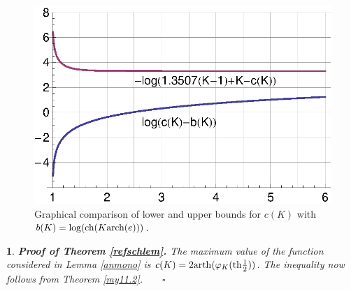 \documentclass[12pt,a4paper,leqno]{amsart}
\theoremstyle{plain}
\newtheorem{subsec}[equation]{}
\numberwithin{equation}{section}          %
\begin{document}
\bigskip
\begin{figure}
\includegraphics[width=12cm]{ckfig.eps}
\caption{Graphical comparison of lower and upper bounds for $c(K)$ with
 $b(K)=\log({\rm ch}(K {\rm arch}(e)))$.}
\end{figure}



\begin{subsec}{\bf Proof of Theorem \ref{refschlem}.}
{\rm  The maximum value of the function considered in Lemma \ref{anmono} is
 $c(K)=2{\rm arth}(\varphi_K({\rm th}\frac{1}{2}))$}. {\rm  The inequality
now follows from Theorem \ref{my11.2}.$\qquad\square$
}
\end{subsec}
\end{document}
